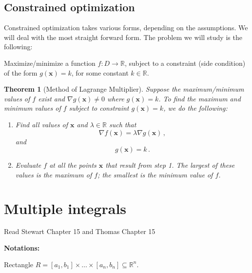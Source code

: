 \documentclass[
]{book}
\newtheorem{theorem}{Theorem}[chapter]
\theoremstyle{definition}
\theoremstyle{definition}
\theoremstyle{definition}
\theoremstyle{definition}
\theoremstyle{remark}
\begin{document}
\hypertarget{constrained-optimization}{%
\section{Constrained optimization}\label{constrained-optimization}}

Constrained optimization takes various forms, depending on the assumptions.
We will deal with the most straight forward form.
The problem we will study is the following:

Maximize/minimize a function \(f:D\to \mathbb{R}\), subject to a constraint (side condition)
of the form
\(g(\mathbf{x}) = k\), for some constant \(k\in \mathbb{R}\).

\begin{theorem}[Method of Lagrange Multiplier]

Suppose the maximum/minimum values of \(f\) exist and \(\nabla g(\mathbf{x}) \not=0\) where \(g(\mathbf{x}) = k\).
To find the maximum and minimum values of \(f\) subject to constraint
\(g(\mathbf{x}) = k\), we do the following:

\begin{enumerate}
\def\labelenumi{\arabic{enumi}.}
\item
  Find all values of \(\mathbf{x}\) and \(\lambda \in \mathbb{R}\) such that
  \begin{equation*}
   \nabla f(\mathbf{x}) =\lambda \nabla g(\mathbf{x})\,,
  \end{equation*}
  and
  \begin{equation*}
   g(\mathbf{x}) = k \,.
  \end{equation*}
\item
  Evaluate \(f\) at all the points \(\mathbf{x}\) that result from step 1. The largest of
  these values is the maximum of \(f\); the smallest is the minimum value of \(f\).
\end{enumerate}

\end{theorem}

\newpage

\hypertarget{multiple-integrals}{%
\chapter{Multiple integrals}\label{multiple-integrals}}

Read Stewart Chapter 15 and Thomas Chapter 15

\textbf{Notations:}

Rectangle \(R= [a_1,b_1]\times \dots \times [a_n, b_n] \subseteq \mathbb{R}^n\).
\end{document}
